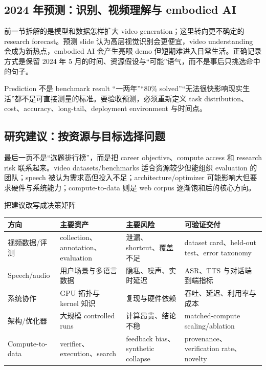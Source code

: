 \subsection{2024 年预测：识别、视频理解与 embodied AI}

前一节拆解的是模型和数据怎样扩大 video generation；这里转向更不确定的 research forecast。预测 slide 认为高层视觉识别会更便宜，video understanding 会成为新热点，embodied AI 会产生亮眼 demo 但短期难进入日常生活。正确记录方式是保留 2024 年 5 月的时间、资源假设与“可能”语气，而不是事后只挑选命中的句子。


\begin{warningbox}{Prediction 不是 benchmark result}
“一两年”“80\% solved”“无法很快影响现实生活”都不是可直接测量的标准。要验收预测，必须重新定义 task distribution、cost、accuracy、long-tail、deployment environment 与时间点。
\end{warningbox}


\subsection{研究建议：按资源与目标选择问题}

最后一页不是“选题排行榜”，而是把 career objective、compute access 和 research risk 联系起来。video datasets/benchmarks 适合资源较少但能组织 evaluation 的团队；speech 被认为需求高但投入不足；architecture/optimizer 可能影响大但要求硬件与系统能力；compute-to-data 则是 web corpus 逐渐饱和后的核心方向。


\begin{knowledgebox}{把建议改写成决策矩阵}
\small\sloppy
\begin{tabularx}{\textwidth}{L{0.17\textwidth} L{0.20\textwidth} L{0.20\textwidth} X}
\toprule
方向 & 主要资产 & 主要风险 & 可验证交付 \\
\midrule
视频数据/评测 & collection、annotation、evaluation & 泄漏、shortcut、覆盖不足 & dataset card、held-out test、error taxonomy \\
Speech/audio & 用户场景与多语言数据 & 隐私、噪声、实时延迟 & ASR、TTS 与对话端到端指标 \\
系统协作 & GPU 拓扑与 kernel 知识 & 复现与硬件依赖 & 吞吐、延迟、利用率与成本 \\
架构/优化器 & 大规模 controlled runs & 计算昂贵、结论不稳 & matched-compute scaling/ablation \\
Compute-to-data & verifier、execution、search & feedback bias、synthetic collapse & provenance、verification rate、novelty \\
\bottomrule
\end{tabularx}
\end{knowledgebox}

